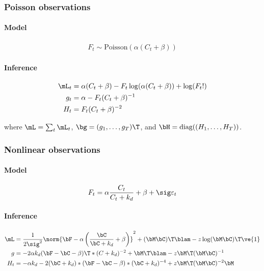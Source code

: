 \subsubsection{Poisson observations}
\paragraph{Model}

\begin{align}
	F_t \sim \text{Poisson}(\alpha (C_t + \beta))
\end{align}


\paragraph{Inference}

\begin{subequations} 
\begin{align}
\mL_{t} &= \alpha (C_t + \beta) - F_{t} \log(\alpha(C_t + \beta)) + \log(F_{t}!)  \\
g_{t} &= \alpha - F_{t}(C_t + \beta)^{-1} \\
H_{t} &= F_{t} (C_t + \beta)^{-2}
\end{align}
\end{subequations}

\noindent where $\mL=\sum_{t} \mL_{t}$, $\bg=(g_{1}, \ldots, g_{T})\T$, and $\bH=\text{diag}((H_1, \ldots, H_T))$.


\subsubsection{Nonlinear observations}
\paragraph{Model}

\begin{align}
	F_t = \alpha \frac{C_t}{C_t + k_d} + \beta + \sig \varepsilon_t
\end{align}

\paragraph{Inference}

\begin{subequations} 
\begin{align}
\mL &= \frac{1}{2\sig^2} \norm{\bF - \alpha\left( \frac{\bC}{\bC+k_d} + \beta\right)}^2 + (\bM \bC)\T \blam - z \log (\bM\bC)\T \ve{1}  \\
g &= -2 \alpha k_d (\bF - \bC - \beta)\T  \ast (C+k_d)^{-2} + \bM\T\blam - z \bM\T (\bM\bC)^{-1} \\
H_{t} &= -\alpha k_d - 2(\bC + k_d) \ast (\bF-\bC-\beta) \ast (\bC + k_d)^{-4} + z \bM\T (\bM \bC)^{-2} \bM
\end{align}
\end{subequations}

